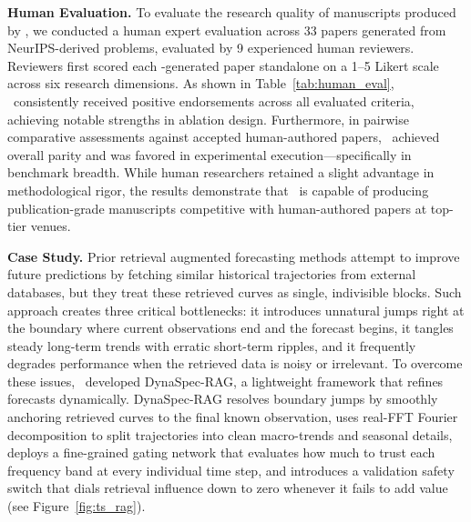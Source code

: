 
\noindent\textbf{Human Evaluation.} To evaluate the research quality of manuscripts produced by \sname, we conducted a human expert evaluation across 33 papers generated from NeurIPS-derived problems, evaluated by 9 experienced human reviewers. Reviewers first scored each \sname-generated paper standalone on a 1--5 Likert scale across six research dimensions. As shown in Table~\ref{tab:human_eval}, \sname~consistently received positive endorsements across all evaluated criteria, achieving notable strengths in ablation design. Furthermore, in pairwise comparative assessments against accepted human-authored papers, \sname~achieved overall parity and was favored in experimental execution—specifically in benchmark breadth. While human researchers retained a slight advantage in methodological rigor, the results demonstrate that \sname~is capable of producing publication-grade manuscripts competitive with human-authored papers at top-tier venues.



\noindent\textbf{Case Study.} Prior retrieval augmented forecasting methods \citep{ning2025tsrag} attempt to improve future predictions by fetching similar historical trajectories from external databases, but they treat these retrieved curves as single, indivisible blocks. Such approach creates three critical bottlenecks: it introduces unnatural jumps right at the boundary where current observations end and the forecast begins, it tangles steady long-term trends with erratic short-term ripples, and it frequently degrades performance when the retrieved data is noisy or irrelevant. To overcome these issues, \sname~developed DynaSpec-RAG, a lightweight framework that refines forecasts dynamically. DynaSpec-RAG resolves boundary jumps by smoothly anchoring retrieved curves to the final known observation, uses real-FFT Fourier decomposition to split trajectories into clean macro-trends and seasonal details, deploys a fine-grained gating network that evaluates how much to trust each frequency band at every individual time step, and introduces a validation safety switch that dials retrieval influence down to zero whenever it fails to add value (see Figure~\ref{fig:ts_rag}).

